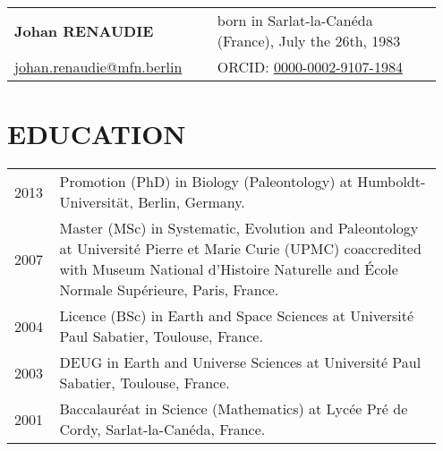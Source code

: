 \documentclass[11pt, a4paper]{article}
\begin{document}
\begin{longtable}{@{}p{0.45\linewidth} >{\raggedleft\arraybackslash}p{0.5\linewidth}@{}}
{\bfseries \Large Johan RENAUDIE} & born in Sarlat-la-Can\'{e}da (France), July the 26th, 1983 \\
\href{mailto:johan.renaudie@mfn.berlin}{johan.renaudie@mfn.berlin} & ORCID: \href{http://orcid.org/0000-0002-9107-1984}{0000-0002-9107-1984}\\
\hline
\end{longtable}

\section{EDUCATION}
\begin{longtable}{@{}p{0.1\linewidth} P{0.85\linewidth}@{}}
2013 & Promotion (PhD) in Biology (Paleontology) at Humboldt-Universit\"{a}t, Berlin, Germany.\\
2007 & Master (MSc) in Systematic, Evolution and Paleontology at Universit\'{e} Pierre et Marie Curie (UPMC) coaccredited with Museum National d'Histoire Naturelle and \'{E}cole Normale Sup\'{e}rieure, Paris, France.\\
2004 & Licence (BSc) in Earth and Space Sciences at Universit\'{e} Paul Sabatier, Toulouse, France.\\
2003 & DEUG in Earth and Universe Sciences at Universit\'{e} Paul Sabatier, Toulouse, France.\\
2001 & Baccalaur\'{e}at in Science (Mathematics) at Lyc\'{e}e Pr\'{e} de Cordy, Sarlat-la-Can\'{e}da, France.\\
\end{longtable}
\end{document}
